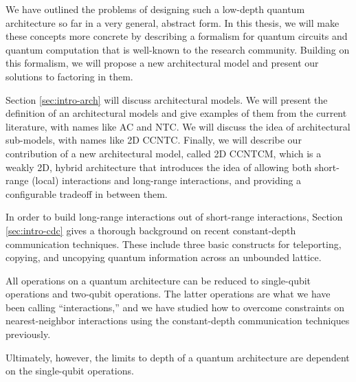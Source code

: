 We have outlined the problems of designing such a low-depth quantum architecture so far in a very general,
abstract form. In this thesis, we will make these concepts more concrete by describing a formalism for
quantum circuits and quantum computation that is well-known to the research community.
Building on this formalism, we will propose a new architectural model and present our solutions to factoring in them.


Section \ref{sec:intro-arch} will discuss architectural models. We will present the definition of an
architectural models and give examples of them from the
current literature, with names like \textsf{AC} and \textsf{NTC}. We will discuss the idea of architectural
sub-models, with names like \textsf{2D CCNTC}. Finally,
we will describe our contribution of a new architectural model, called
\textsf{2D CCNTCM}, which is a weakly 2D,
hybrid architecture that introduces the idea of allowing both short-range
(local) interactions and long-range
interactions, and providing a configurable tradeoff in between them.

In order to build long-range interactions out of short-range interactions,
Section \ref{sec:intro-cdc} 
gives a thorough background on recent constant-depth communication techniques. These include three
basic constructs for teleporting, copying, and uncopying quantum information across an unbounded
lattice.

All operations on a quantum architecture can be reduced to single-qubit operations and two-qubit operations.
The latter operations are what we have been calling ``interactions,'' and we have studied how to overcome
constraints on nearest-neighbor interactions using the constant-depth communication techniques previously.

Ultimately, however, the limits to depth of a quantum architecture are
dependent on the single-qubit operations. 

